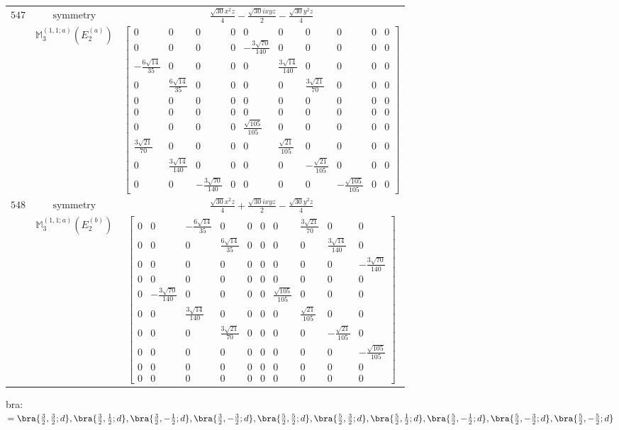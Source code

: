\documentclass[fleqn,8pt,landscape]{jsarticle}
\begin{document}
\begin{longtable}{ccc}
$ 547 $ & $ \text{symmetry} $ & $ \frac{\sqrt{30} x^{2} z}{4} - \frac{\sqrt{30} i x y z}{2} - \frac{\sqrt{30} y^{2} z}{4} $ \\
$  $ & $ \mathbb{M}_{3}^{(1,1;a)}(E_{2}^{(a)}) $ & $ \begin{bmatrix} 0 & 0 & 0 & 0 & 0 & 0 & 0 & 0 & 0 & 0 \\ 0 & 0 & 0 & 0 & - \frac{3 \sqrt{70}}{140} & 0 & 0 & 0 & 0 & 0 \\ - \frac{6 \sqrt{14}}{35} & 0 & 0 & 0 & 0 & \frac{3 \sqrt{14}}{140} & 0 & 0 & 0 & 0 \\ 0 & \frac{6 \sqrt{14}}{35} & 0 & 0 & 0 & 0 & \frac{3 \sqrt{21}}{70} & 0 & 0 & 0 \\ 0 & 0 & 0 & 0 & 0 & 0 & 0 & 0 & 0 & 0 \\ 0 & 0 & 0 & 0 & 0 & 0 & 0 & 0 & 0 & 0 \\ 0 & 0 & 0 & 0 & \frac{\sqrt{105}}{105} & 0 & 0 & 0 & 0 & 0 \\ \frac{3 \sqrt{21}}{70} & 0 & 0 & 0 & 0 & \frac{\sqrt{21}}{105} & 0 & 0 & 0 & 0 \\ 0 & \frac{3 \sqrt{14}}{140} & 0 & 0 & 0 & 0 & - \frac{\sqrt{21}}{105} & 0 & 0 & 0 \\ 0 & 0 & - \frac{3 \sqrt{70}}{140} & 0 & 0 & 0 & 0 & - \frac{\sqrt{105}}{105} & 0 & 0 \end{bmatrix} $ \\ \hline
$ 548 $ & $ \text{symmetry} $ & $ \frac{\sqrt{30} x^{2} z}{4} + \frac{\sqrt{30} i x y z}{2} - \frac{\sqrt{30} y^{2} z}{4} $ \\
$  $ & $ \mathbb{M}_{3}^{(1,1;a)}(E_{2}^{(b)}) $ & $ \begin{bmatrix} 0 & 0 & - \frac{6 \sqrt{14}}{35} & 0 & 0 & 0 & 0 & \frac{3 \sqrt{21}}{70} & 0 & 0 \\ 0 & 0 & 0 & \frac{6 \sqrt{14}}{35} & 0 & 0 & 0 & 0 & \frac{3 \sqrt{14}}{140} & 0 \\ 0 & 0 & 0 & 0 & 0 & 0 & 0 & 0 & 0 & - \frac{3 \sqrt{70}}{140} \\ 0 & 0 & 0 & 0 & 0 & 0 & 0 & 0 & 0 & 0 \\ 0 & - \frac{3 \sqrt{70}}{140} & 0 & 0 & 0 & 0 & \frac{\sqrt{105}}{105} & 0 & 0 & 0 \\ 0 & 0 & \frac{3 \sqrt{14}}{140} & 0 & 0 & 0 & 0 & \frac{\sqrt{21}}{105} & 0 & 0 \\ 0 & 0 & 0 & \frac{3 \sqrt{21}}{70} & 0 & 0 & 0 & 0 & - \frac{\sqrt{21}}{105} & 0 \\ 0 & 0 & 0 & 0 & 0 & 0 & 0 & 0 & 0 & - \frac{\sqrt{105}}{105} \\ 0 & 0 & 0 & 0 & 0 & 0 & 0 & 0 & 0 & 0 \\ 0 & 0 & 0 & 0 & 0 & 0 & 0 & 0 & 0 & 0 \end{bmatrix} $ \\ \hline
\end{longtable}
bra: $=\bra{\frac{3}{2},\frac{3}{2};d}, \bra{\frac{3}{2},\frac{1}{2};d}, \bra{\frac{3}{2},- \frac{1}{2};d}, \bra{\frac{3}{2},- \frac{3}{2};d}, \bra{\frac{5}{2},\frac{5}{2};d}, \bra{\frac{5}{2},\frac{3}{2};d}, \bra{\frac{5}{2},\frac{1}{2};d}, \bra{\frac{5}{2},- \frac{1}{2};d}, \bra{\frac{5}{2},- \frac{3}{2};d}, \bra{\frac{5}{2},- \frac{5}{2};d}$
\end{document}
